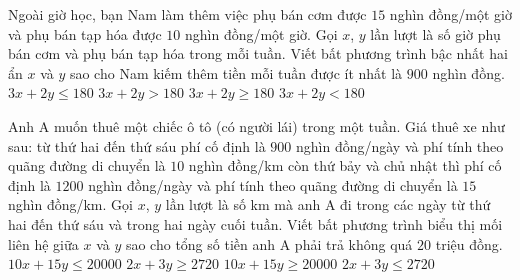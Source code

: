 \begin{ex}%
	Ngoài giờ học, bạn Nam làm thêm việc phụ bán cơm được $15$ nghìn đồng/một giờ và phụ bán tạp hóa được $10$ nghìn đồng/một giờ. Gọi $x$, $y$ lần lượt là số giờ phụ bán cơm và phụ bán tạp hóa trong mỗi tuần. Viết bất phương trình bậc nhất hai ẩn $x$ và $y$ sao cho Nam kiếm thêm tiền mỗi tuần được ít nhất là $900$ nghìn đồng.
	\choice
	{$3x+2y\le 180$}
	{$3x+2y> 180$}
	{\True $3x+2y\ge 180$}
	{$3x+2y< 180$}
\end{ex}


\begin{ex}%
	Anh A muốn thuê một chiếc ô tô (có người lái) trong một tuần. Giá thuê xe như sau: từ thứ hai đến thứ sáu phí cố định là $900$ nghìn đồng/ngày và phí tính theo quãng đường di chuyển là $10$ nghìn đồng/km còn thứ bảy và chủ nhật thì phí cố định là $1200$ nghìn đồng/ngày và phí tính theo quãng đường di chuyển là $15$ nghìn đồng/km. Gọi $x$, $y$ lần lượt là số km mà anh A đi trong các ngày từ thứ hai đến thứ sáu và trong hai ngày cuối tuần. Viết bất phương trình biểu thị mối liên hệ giữa $x$ và $y$ sao cho tổng số tiền anh A phải trả không quá $20$ triệu đồng.
	\choice
	{$10x+15y\le 20000$}
	{$2x+3y\ge 2720$}
	{$10x+15y\ge 20000$}
	{\True $2x+3y\le 2720$}
\end{ex}

